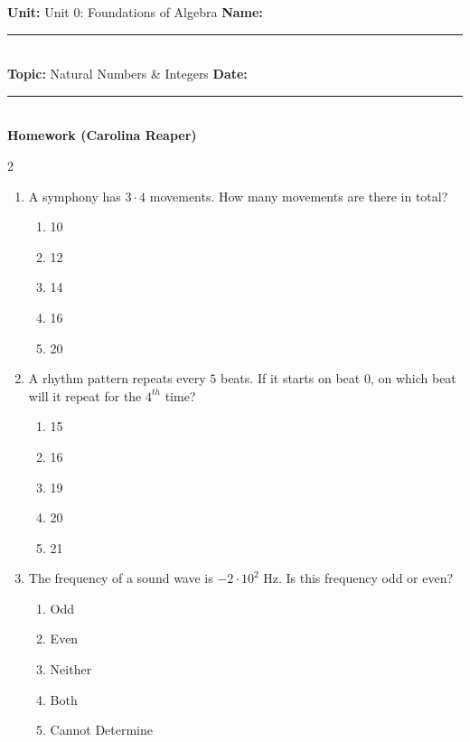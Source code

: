 \documentclass[10pt]{article}
\begin{document}
\enlargethispage{2.5cm}

\begin{tcolorbox}[colback=mainblue!5, colframe=mainblue, sharp corners, boxrule=0.5pt]
    \small \textbf{Unit:} Unit 0: Foundations of Algebra \hfill \textbf{Name:} \rule{3cm}{0.4pt} \\
    \small \textbf{Topic:} Natural Numbers & Integers \hfill \textbf{Date:} \rule{2cm}{0.4pt} \\
    \centering \textbf{\large Homework (Carolina Reaper)}
\end{tcolorbox}

\vspace{0.2cm}

\begin{multicols}{2}
\begin{enumerate}[label=\textbf{Q\arabic*.}, leftmargin=*, itemsep=6pt, parsep=0pt]

  \item \small A symphony has $3 \cdot 4$ movements. How many movements are there in total?
  \begin{enumerate}[label=(\Alph*), leftmargin=0.6cm, nosep, itemsep=2pt]
    \item 10
    \item 12
    \item 14
    \item 16
    \item 20
  \end{enumerate}

  \item \small A rhythm pattern repeats every $5$ beats. If it starts on beat $0$, on which beat will it repeat for the $4^{th}$ time?
  \begin{enumerate}[label=(\Alph*), leftmargin=0.6cm, nosep, itemsep=2pt]
    \item 15
    \item 16
    \item 19
    \item 20
    \item 21
  \end{enumerate}

  \item \small The frequency of a sound wave is $-2 \cdot 10^{2}$ Hz. Is this frequency odd or even?
  \begin{enumerate}[label=(\Alph*), leftmargin=0.6cm, nosep, itemsep=2pt]
    \item Odd
    \item Even
    \item Neither
    \item Both
    \item Cannot Determine
  \end{enumerate}


\end{enumerate}
\end{multicols}
\end{document}
